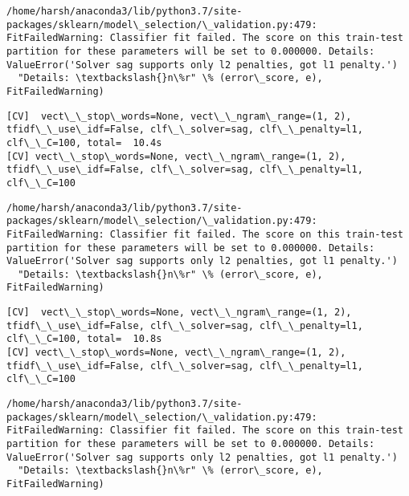 \documentclass[11pt]{article}
\begin{document}
    \begin{Verbatim}[commandchars=\\\{\}]
/home/harsh/anaconda3/lib/python3.7/site-packages/sklearn/model\_selection/\_validation.py:479: FitFailedWarning: Classifier fit failed. The score on this train-test partition for these parameters will be set to 0.000000. Details: 
ValueError('Solver sag supports only l2 penalties, got l1 penalty.')
  "Details: \textbackslash{}n\%r" \% (error\_score, e), FitFailedWarning)

    \end{Verbatim}

    \begin{Verbatim}[commandchars=\\\{\}]
[CV]  vect\_\_stop\_words=None, vect\_\_ngram\_range=(1, 2), tfidf\_\_use\_idf=False, clf\_\_solver=sag, clf\_\_penalty=l1, clf\_\_C=100, total=  10.4s
[CV] vect\_\_stop\_words=None, vect\_\_ngram\_range=(1, 2), tfidf\_\_use\_idf=False, clf\_\_solver=sag, clf\_\_penalty=l1, clf\_\_C=100 

    \end{Verbatim}

    \begin{Verbatim}[commandchars=\\\{\}]
/home/harsh/anaconda3/lib/python3.7/site-packages/sklearn/model\_selection/\_validation.py:479: FitFailedWarning: Classifier fit failed. The score on this train-test partition for these parameters will be set to 0.000000. Details: 
ValueError('Solver sag supports only l2 penalties, got l1 penalty.')
  "Details: \textbackslash{}n\%r" \% (error\_score, e), FitFailedWarning)

    \end{Verbatim}

    \begin{Verbatim}[commandchars=\\\{\}]
[CV]  vect\_\_stop\_words=None, vect\_\_ngram\_range=(1, 2), tfidf\_\_use\_idf=False, clf\_\_solver=sag, clf\_\_penalty=l1, clf\_\_C=100, total=  10.8s
[CV] vect\_\_stop\_words=None, vect\_\_ngram\_range=(1, 2), tfidf\_\_use\_idf=False, clf\_\_solver=sag, clf\_\_penalty=l1, clf\_\_C=100 

    \end{Verbatim}

    \begin{Verbatim}[commandchars=\\\{\}]
/home/harsh/anaconda3/lib/python3.7/site-packages/sklearn/model\_selection/\_validation.py:479: FitFailedWarning: Classifier fit failed. The score on this train-test partition for these parameters will be set to 0.000000. Details: 
ValueError('Solver sag supports only l2 penalties, got l1 penalty.')
  "Details: \textbackslash{}n\%r" \% (error\_score, e), FitFailedWarning)

    \end{Verbatim}
\end{document}
